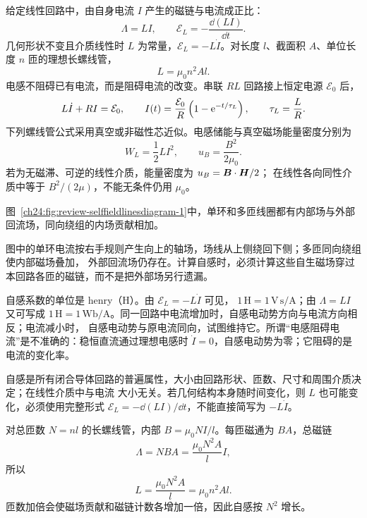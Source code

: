 {给定线性回路中，由自身电流 $I$ 产生的磁链与电流成正比：
\begin{equation}
  \boxed{\Lambda=LI},
  \qquad
  \boxed{\mathcal E_L=-\frac{\dd(LI)}{\dd t}}.
\end{equation}
几何形状不变且介质线性时 $L$ 为常量，$\mathcal E_L=-L\dot I$。对长度 $l$、截面积 $A$、单位长度
$n$ 匝的理想长螺线管，
\begin{equation}
  \boxed{L=\mu_0n^2Al}.
\end{equation}
电感不阻碍已有电流，而是阻碍电流的改变。串联 $RL$ 回路接上恒定电源 $\mathcal E_0$ 后，
\begin{equation}
  L\dot I+RI=\mathcal E_0,
  \qquad
  I(t)=\frac{\mathcal E_0}{R}\left(1-\mathrm e^{-t/\tau_L}\right),
  \qquad \tau_L=\frac LR.
\end{equation}
下列螺线管公式采用真空或非磁性芯近似。电感储能与真空磁场能量密度分别为
\begin{equation}
  \boxed{W_L=\frac12LI^2},
  \qquad
  \boxed{u_B=\frac{B^2}{2\mu_0}}.
\end{equation}
若为无磁滞、可逆的线性介质，能量密度为 $u_B=\bm{B}\cdot\bm{H}/2$；
在线性各向同性介质中等于 $B^2/(2\mu)$，不能无条件仍用 $\mu_0$。

图~\ref{ch24:fig:review-selffieldlinesdiagram-1}中，单环和多匝线圈都有内部场与外部回流场，同向绕组的内场贡献相加。
\par\noindent\begin{minipage}{\linewidth}
\selfFieldLinesDiagram
{}
\end{minipage}\par\medskip
图中的单环电流按右手规则产生向上的轴场，场线从上侧绕回下侧；多匝同向绕组使内部磁场叠加，
外部回流场仍存在。计算自感时，必须计算这些自生磁场穿过本回路各匝的磁链，而不是把外部场另行遗漏。

自感系数的单位是 henry（H）。由 $\mathcal E_L=-L\dot I$ 可见，
$1\,\mathrm H=1\,\mathrm{V\,s/A}$；由 $\Lambda=LI$ 又可写成
$1\,\mathrm H=1\,\mathrm{Wb/A}$。同一回路中电流增加时，自感电动势方向与电流方向相反；电流减小时，
自感电动势与原电流同向，试图维持它。所谓“电感阻碍电流”是不准确的：稳恒直流通过理想电感时
$\dot I=0$，自感电动势为零；它阻碍的是电流的变化率。

自感是所有闭合导体回路的普遍属性，大小由回路形状、匝数、尺寸和周围介质决定；在线性介质中与电流
大小无关。若几何结构本身随时间变化，则 $L$ 也可能变化，必须使用完整形式
$\mathcal E_L=-\dd(LI)/\dd t$，不能直接简写为 $-L\dot I$。

对总匝数 $N=nl$ 的长螺线管，内部 $B=\mu_0NI/l$。每匝磁通为 $BA$，总磁链
\begin{equation}
  \Lambda=NBA=\frac{\mu_0N^2A}{l}I,
\end{equation}
所以
\begin{equation}
  L=\frac{\mu_0N^2A}{l}=\mu_0n^2Al.
\end{equation}
匝数加倍会使磁场贡献和磁链计数各增加一倍，因此自感按 $N^2$ 增长。

}

